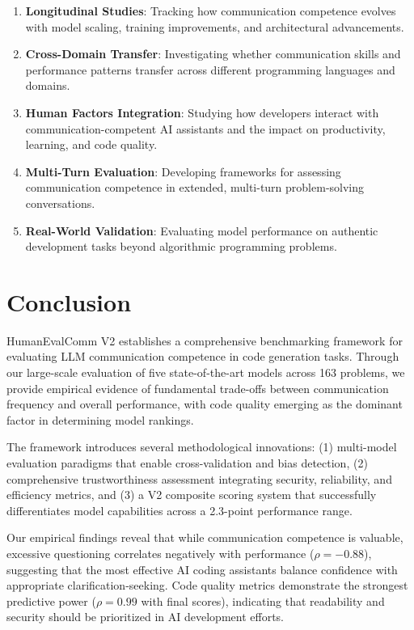 \documentclass[conference]{IEEEtran}
\begin{document}
\begin{enumerate}
    \item \textbf{Longitudinal Studies}: Tracking how communication competence evolves with model scaling, training improvements, and architectural advancements.
    \item \textbf{Cross-Domain Transfer}: Investigating whether communication skills and performance patterns transfer across different programming languages and domains.
    \item \textbf{Human Factors Integration}: Studying how developers interact with communication-competent AI assistants and the impact on productivity, learning, and code quality.
    \item \textbf{Multi-Turn Evaluation}: Developing frameworks for assessing communication competence in extended, multi-turn problem-solving conversations.
    \item \textbf{Real-World Validation}: Evaluating model performance on authentic development tasks beyond algorithmic programming problems.
\end{enumerate}

\section{Conclusion}

HumanEvalComm V2 establishes a comprehensive benchmarking framework for evaluating LLM communication competence in code generation tasks. Through our large-scale evaluation of five state-of-the-art models across 163 problems, we provide empirical evidence of fundamental trade-offs between communication frequency and overall performance, with code quality emerging as the dominant factor in determining model rankings.

The framework introduces several methodological innovations: (1) multi-model evaluation paradigms that enable cross-validation and bias detection, (2) comprehensive trustworthiness assessment integrating security, reliability, and efficiency metrics, and (3) a V2 composite scoring system that successfully differentiates model capabilities across a 2.3-point performance range.

Our empirical findings reveal that while communication competence is valuable, excessive questioning correlates negatively with performance ($\rho = -0.88$), suggesting that the most effective AI coding assistants balance confidence with appropriate clarification-seeking. Code quality metrics demonstrate the strongest predictive power ($\rho = 0.99$ with final scores), indicating that readability and security should be prioritized in AI development efforts.
\end{document}
